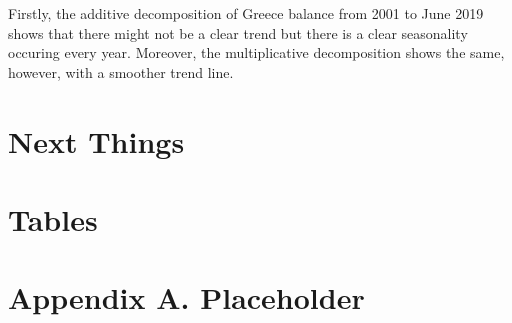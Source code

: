 \documentclass[12pt]{article}
\begin{document}
Firstly, the additive decomposition of Greece balance from 2001 to June 2019 shows that there might not be a clear trend but there is a clear seasonality occuring every year. Moreover, the multiplicative decomposition shows the same, however, with a smoother trend line. 

\section{Next Things}



\singlespacing
\setlength\bibsep{0pt}



\clearpage

\onehalfspacing

\section*{Tables} \label{sec:tab}

\section*{Appendix A. Placeholder} \label{sec:appendixa}
\end{document}
